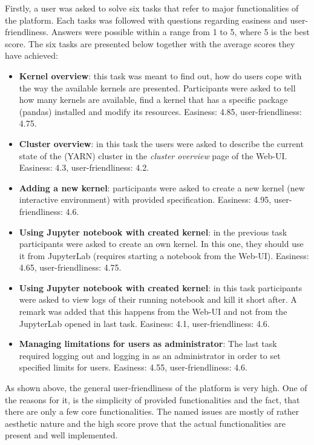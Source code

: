 \documentclass[a4paper,twoside]{article}
\begin{document}
Firstly, a user was asked to solve six tasks that refer to major functionalities of the platform. Each tasks was followed with questions regarding easiness and user-friendliness. Answers were possible within a range from 1 to 5, where 5 is the best score. The six tasks are presented below together with the average scores they have achieved:
\begin{itemize}
    \item \textbf{Kernel overview}: this task was meant to find out, how do users cope with the way the available kernels are presented. Participants were asked to tell how many kernels are available, find a kernel that has a specific package (pandas) installed and modify its resources. Easiness: 4.85, user-friendliness: 4.75.
    \item \textbf{Cluster overview}: in this task the users were asked to describe the current state of the (YARN) cluster in the \textit{cluster overview} page of the Web-UI. Easiness: 4.3, user-friendliness: 4.2.  
    \item \textbf{Adding a new kernel}: participants were asked to create a new kernel (new interactive environment) with provided specification. Easiness: 4.95, user-friendliness: 4.6. 
    \item \textbf{Using Jupyter notebook with created kernel}: in the previous task participants were asked to create an own kernel. In this one, they should use it from JupyterLab (requires starting a notebook from the Web-UI). Easiness: 4.65, user-friendliness: 4.75.
    \item \textbf{Using Jupyter notebook with created kernel}: in this task participants were asked to  view logs of their running notebook and kill it short after. A remark was added that this happens from the Web-UI and not from the JupyterLab opened in last task. Easiness: 4.1, user-friendliness: 4.6.
    \item \textbf{Managing limitations for users as administrator}: The last task required logging out and logging in as an administrator in order to set specified limits for users. Easiness: 4.55, user-friendliness: 4.6.
\end{itemize}

As shown above, the general user-friendliness of the platform is very high. One of the reasons for it, is the simplicity of provided functionalities and the fact, that there are only a few core functionalities. The named issues are mostly of rather aesthetic nature and the high score prove that the actual functionalities are present and well implemented.
\end{document}
